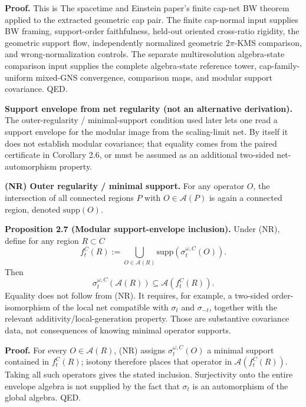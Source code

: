 \textbf{Proof.} This is The spacetime and Einstein paper's finite cap-net BW theorem applied to the extracted
geometric cap pair. The finite cap-normal input supplies BW framing, support-order faithfulness,
held-out oriented cross-ratio rigidity, the geometric support flow, independently normalized
geometric \(2\pi\)-KMS comparison, and wrong-normalization controls. The separate
multiresolution algebra-state comparison input supplies the complete algebra-state reference tower,
cap-family-uniform mixed-GNS convergence, comparison maps, and modular support covariance. QED.

\textbf{Support envelope from net regularity (not an alternative derivation).}
The outer-regularity / minimal-support condition used later lets one read a
support envelope for the modular image from the scaling-limit net. By itself it
does not establish modular covariance; that equality comes from the
paired certificate in Corollary 2.6, or must be assumed as an additional
two-sided net-automorphism property.

\textbf{(NR) Outer regularity / minimal support.} For any operator \(O\), the intersection of all connected regions \(P\) with \(O\in\mathcal A(P)\) is again a connected region, denoted \(\mathrm{supp}(O)\).

\textbf{Proposition 2.7 (Modular support-envelope inclusion).} Under (NR), define for any region \(R\subset C\)
\[
f_t^C(R)
:=
\bigcup_{O\in \mathcal A(R)}
\mathrm{supp}\!\left(\sigma_t^{\omega,C}(O)\right).
\]
Then
\[
\sigma_t^{\omega,C}(\mathcal A(R))\subseteq\mathcal A(f_t^C(R)).
\]
Equality does not follow from (NR). It requires, for example, a two-sided
order-isomorphism of the local net compatible with \(\sigma_t\) and
\(\sigma_{-t}\), together with the relevant additivity/local-generation
property. Those are substantive covariance data, not consequences of knowing
minimal operator supports.

\textbf{Proof.} For every \(O\in\mathcal A(R)\), (NR) assigns
\(\sigma_t^{\omega,C}(O)\) a minimal support contained in \(f_t^C(R)\); isotony
therefore places that operator in \(\mathcal A(f_t^C(R))\). Taking all such
operators gives the stated inclusion. Surjectivity onto the entire envelope
algebra is not supplied by the fact that \(\sigma_t\) is an automorphism of the
global algebra. QED.

